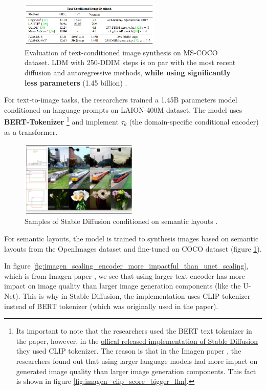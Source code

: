\begin{figure}
    \centering
    \includegraphics[width=0.6\textwidth]{images/diffusion_models/stable_diffusion/experiments_2.png}
    \caption{Evaluation of text-conditioned image synthesis on MS-COCO dataset. LDM with 250-DDIM steps is on par with the most recent diffusion and autoregressive methods, \textbf{while using significantly less parameters} (1.45 billion) \cite{stable_diffusion}.}
\end{figure}

For text-to-image tasks, the researchers trained a 1.45B parameters model conditioned on language prompts on LAION-400M dataset. The model uses \textbf{BERT-Tokenizer} \footnote{Its important to note that the researchers used the BERT text tokenizer in the paper, however, in the \href{https://github.com/CompVis/latent-diffusion}{offical released implementation of Stable Diffusion} they used CLIP tokenizer. The reason is that in the Imagen paper \cite{imagen}, the researchers found out that using larger language models had more impact on generated image quality than larger image generation components. This fact is shown in figure \ref{fig:imagen_clip_score_bigger_llm}.} \cite{bert} and implement $\tau_\theta$ (the domain-specific conditional encoder) as a transformer.

\begin{figure}
    \centering
    \includegraphics[width=0.5\textwidth]{images/diffusion_models/stable_diffusion/experiments_3.png}
    \caption{Samples of Stable Diffusion conditioned on semantic layouts \cite{stable_diffusion}.}
    \label{fig:stable_diffusion_experiments_semantic_layouts}
\end{figure}

For semantic layouts, the model is trained to synthesis images based on semantic layouts from the OpenImages dataset and fine-tuned on COCO dataset (figure \ref{fig:stable_diffusion_experiments_semantic_layouts}).

In figure \ref{fig:imagen_scaling_encoder_more_impactful_than_unet_scaling}, which is from Imagen paper \cite{imagen}, we see that using larger text encoder has more impact on image quality than larger image generation components (like the U-Net). This is why in Stable Diffusion, the implementation uses CLIP tokenizer instead of BERT tokenizer (which was originally used in the paper).
